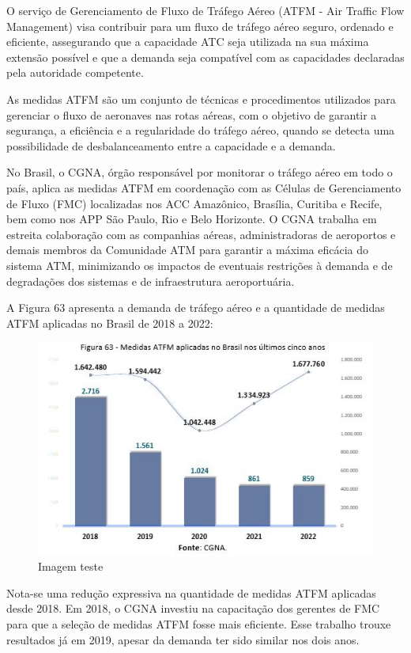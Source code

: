 \documentclass[
]{book}
\begin{document}
O serviço de Gerenciamento de Fluxo de Tráfego Aéreo (ATFM - Air Traffic Flow Management) visa contribuir para um fluxo de tráfego aéreo seguro, ordenado e eficiente, assegurando que a capacidade ATC seja utilizada na sua máxima extensão possível e que a demanda seja compatível com as capacidades declaradas pela autoridade competente.

As medidas ATFM são um conjunto de técnicas e procedimentos utilizados para gerenciar o fluxo de aeronaves nas rotas aéreas, com o objetivo de garantir a segurança, a eficiência e a regularidade do tráfego aéreo, quando se detecta uma possibilidade de desbalanceamento entre a capacidade e a demanda.

No Brasil, o CGNA, órgão responsável por monitorar o tráfego aéreo em todo o país, aplica as medidas ATFM em coordenação com as Células de Gerenciamento de Fluxo (FMC) localizadas nos ACC Amazônico, Brasília, Curitiba e Recife, bem como nos APP São Paulo, Rio e Belo Horizonte. O CGNA trabalha em estreita colaboração com as companhias aéreas, administradoras de aeroportos e demais membros da Comunidade ATM para garantir a máxima eficácia do sistema ATM, minimizando os impactos de eventuais restrições à demanda e de degradações dos sistemas e de infraestrutura aeroportuária.

A Figura 63 apresenta a demanda de tráfego aéreo e a quantidade de medidas ATFM aplicadas no Brasil de 2018 a 2022:

\begin{figure}
\centering
\includegraphics{imagens/fig52.jpg}
\caption{Imagem teste}
\end{figure}

Nota-se uma redução expressiva na quantidade de medidas ATFM aplicadas desde 2018. Em 2018, o CGNA investiu na capacitação dos gerentes de FMC para que a seleção de medidas ATFM fosse mais eficiente. Esse trabalho trouxe resultados já em 2019, apesar da demanda ter sido similar nos dois anos.
\end{document}
